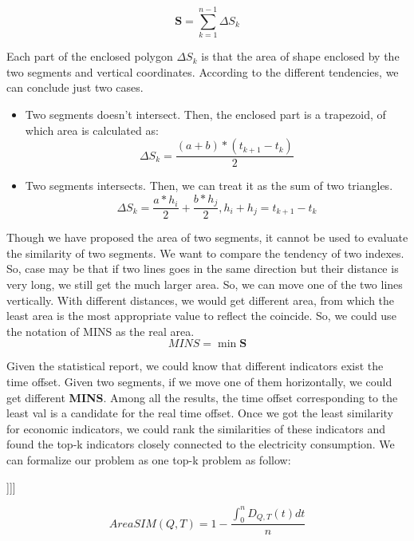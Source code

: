 \begin{definition}	
\begin{displaymath}
\textbf{S} = \sum_{k=1}^{n-1}\Delta S_k	
\end{displaymath}
\end{definition}

Each part of the enclosed polygon \textit{$\Delta S_k$} is that the area of shape enclosed by the two segments and vertical coordinates. According to the different tendencies, we can conclude just two cases.
\begin{itemize}
	\item Two segments doesn't intersect. Then, the enclosed part is a trapezoid, of which area is calculated as:
\begin{equation}
	\Delta S_k = \frac{(a + b) * (t_{k+1} - t_k)}{2}
\end{equation}
	\item Two segments intersects. Then, we can treat it as the sum of two triangles.
\begin{equation}
	\Delta S_k = \frac{a * h_i}{2} + \frac{b * h_j}{2}, h_i + h_j = t_{k+1} - t_k 
\end{equation}
\end{itemize} 

Though we have proposed the area of two segments, it cannot be used to evaluate the similarity of two segments. We want to compare the tendency of two indexes. So, case may be that if two lines goes in the same direction but their distance is very long, we still get the much larger area. So, we can move one of the two lines vertically. With different distances, we would get different area, from which the least area is the most appropriate value to reflect the coincide. So, we could use the notation of MINS as the real area.
\begin{equation}
	MINS = \min{\textbf{S}}	
\end{equation}

Given the statistical report, we could know that different indicators exist the time offset. Given two segments, if we move one of them horizontally, we could get different \textbf{MINS}. Among all the results, the time offset corresponding to the least val is a candidate for the real time offset. Once we got the least similarity for economic indicators, we could rank the similarities of these indicators and found the top-k indicators closely connected to the electricity consumption. We can formalize our problem as one top-k problem as follow:
\begin{definition}
	[[[This part, we can put the top-K problem]]]]
\end{definition} 

\begin{equation}
AreaSIM(Q, T) = 1 - \frac{\int_{0}^{n}D_{Q,T}(t)dt}{n}	
\end{equation}
